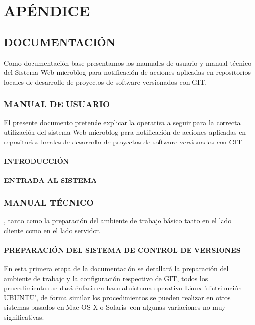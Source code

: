 

%
\chapter{APÉNDICE}
\section{DOCUMENTACIÓN}
Como documentación base presentamos los manuales de usuario y manual técnico del Sistema Web microblog para notificación de acciones aplicadas en repositorios locales de desarrollo de proyectos de software versionados con GIT. 
\subsection{MANUAL DE USUARIO}
El presente documento pretende explicar la operativa a seguir para la correcta utilización del sistema Web microblog para notificación de acciones aplicadas en repositorios locales de desarrollo de proyectos de software versionados con GIT.
\subsubsection{INTRODUCCIÓN}
\subsubsection{ENTRADA AL SISTEMA}

\subsection{MANUAL TÉCNICO}
, tanto como la preparación del ambiente de trabajo básico tanto en el lado cliente como en el lado servidor.
\subsubsection{PREPARACIÓN DEL SISTEMA DE CONTROL DE VERSIONES}

En esta primera etapa de la documentación se detallará la preparación del ambiente de trabajo y la configuración respectivo de GIT, todos los procedimientos se dará énfasis en base al sistema operativo Linux  'distribución UBUNTU', de forma similar los procedimientos se pueden realizar en otros sistemas basados en Mac OS X o Solaris, con algunas variaciones no muy significativas.

